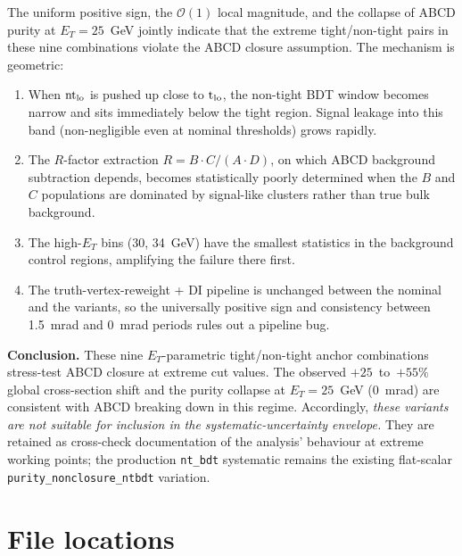 \documentclass[11pt]{article}
\begin{document}
The uniform positive sign, the $\mathcal{O}(1)$ local magnitude, and the
collapse of ABCD purity at $E_T = 25$~GeV jointly indicate that the extreme
tight/non-tight pairs in these nine combinations violate the ABCD closure
assumption. The mechanism is geometric:

\begin{enumerate}
  \item When $\mathrm{nt}_{\rm lo}$ is pushed up close to
        $\mathrm{t}_{\rm lo}$, the non-tight BDT window becomes narrow
        and sits immediately below the tight region. Signal leakage
        into this band (non-negligible even at nominal thresholds) grows
        rapidly.
  \item The $R$-factor extraction
        $R = B \cdot C / (A \cdot D)$, on which ABCD background
        subtraction depends, becomes statistically poorly determined
        when the $B$ and $C$ populations are dominated by signal-like
        clusters rather than true bulk background.
  \item The high-$E_T$ bins (30, 34~GeV) have the smallest
        statistics in the background control regions, amplifying the
        failure there first.
  \item The truth-vertex-reweight + DI pipeline is unchanged between
        the nominal and the variants, so the universally positive sign
        and consistency between 1.5~mrad and 0~mrad periods rules out
        a pipeline bug.
\end{enumerate}

\noindent \textbf{Conclusion.} These nine $E_T$-parametric tight/non-tight
anchor combinations stress-test ABCD closure at extreme cut values.
The observed $+25$~to~$+55\%$ global cross-section shift and the purity
collapse at $E_T = 25$~GeV (0~mrad) are consistent with ABCD breaking
down in this regime. Accordingly, \emph{these variants are not suitable
for inclusion in the systematic-uncertainty envelope.} They are retained
as cross-check documentation of the analysis' behaviour at extreme
working points; the production \texttt{nt\_bdt} systematic remains the
existing flat-scalar \texttt{purity\_nonclosure\_ntbdt} variation.

\appendix
\section{File locations}
\end{document}
